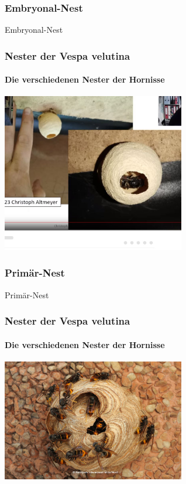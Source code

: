 \documentclass[aspectratio=169]{beamer}
\begin{document}
\subsubsection[Embryonal-Nest]{Embryonal-Nest}

\begin{frame}{Embryonal-Nest}
\frametitle{Nester der Vespa velutina} 
\framesubtitle{Die verschiedenen Nester der Hornisse}
	\begin{center}
		\includegraphics[width=0.6\textwidth]{figures/Altmeyer3.jpg}
	\end{center}
\end{frame}

\subsubsection[Sekundär-Nest]{Primär-Nest}

\begin{frame}{Primär-Nest}
\frametitle{Nester der Vespa velutina} 
\framesubtitle{Die verschiedenen Nester der Hornisse}

	\begin{center}	
		\includegraphics[width=0.6\textwidth]{figures/asiatische_hornisse4.jpg}
	\end{center}
	
\end{frame}
\end{document}
